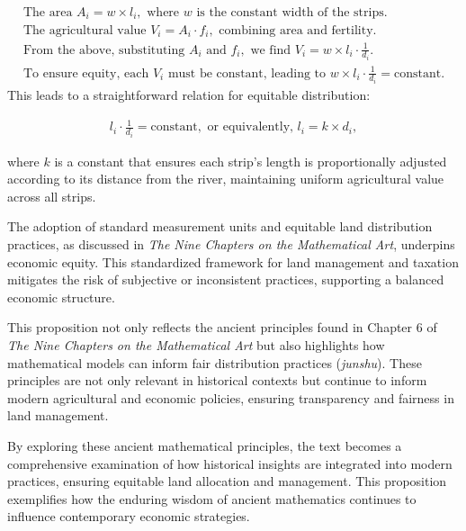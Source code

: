 \documentclass[10pt]{article}
\begin{document}
\begin{align}
    & \text{The area } A_i = w \times l_i, \text{ where } w \text{ is the constant width of the strips.} & \nonumber \\
    & \text{The agricultural value } V_i = A_i \cdot f_i, \text{ combining area and fertility.} & \nonumber \\
    & \text{From the above, substituting } A_i \text{ and } f_i, \text{ we find } V_i = w \times l_i \cdot \frac{1}{d_i}. & \nonumber \\
    & \text{To ensure equity, each } V_i \text{ must be constant, leading to } w \times l_i \cdot \frac{1}{d_i} = \text{constant}. & \nonumber
\end{align}
This leads to a straightforward relation for equitable distribution:

\begin{align}
    & l_i \cdot \frac{1}{d_i} = \text{constant}, \text{ or equivalently, } l_i = k \times d_i, & \nonumber
\end{align}

where \(k\) is a constant that ensures each strip’s length is proportionally adjusted according to its distance from the river, maintaining uniform agricultural value across all strips.

\vspace{7pt}

The adoption of standard measurement units and equitable land distribution practices, as discussed in \textit{The Nine Chapters on the Mathematical Art}, underpins economic equity. This standardized framework for land management and taxation mitigates the risk of subjective or inconsistent practices, supporting a balanced economic structure.

\vspace{7pt}

This proposition not only reflects the ancient principles found in Chapter 6 of \textit{The Nine Chapters on the Mathematical Art} but also highlights how mathematical models can inform fair distribution practices (\textit{junshu}). These principles are not only relevant in historical contexts but continue to inform modern agricultural and economic policies, ensuring transparency and fairness in land management.

\vspace{7pt}

By exploring these ancient mathematical principles, the text becomes a comprehensive examination of how historical insights are integrated into modern practices, ensuring equitable land allocation and management. This proposition exemplifies how the enduring wisdom of ancient mathematics continues to influence contemporary economic strategies.
\end{document}
